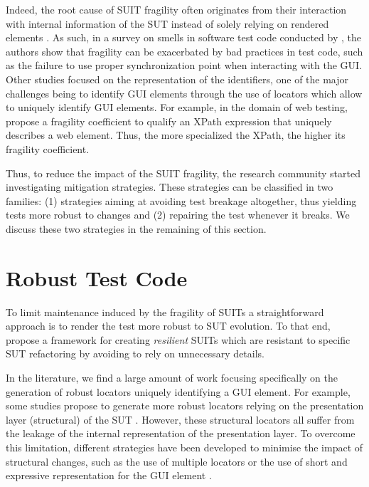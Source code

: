 Indeed, the root cause of SUIT fragility often originates from their interaction with internal information of the SUT instead of solely relying on rendered elements \textcite{Yandrapally2014}. As such, in a survey on smells in software test code conducted by \textcite{Garousi2018}, the authors show that fragility can be exacerbated by bad practices in test code, such as the failure to use proper synchronization point when interacting with the GUI. Other studies focused on the representation of the identifiers, one of the major challenges being to identify GUI elements through the use of locators \cite{Hammoudi2016} which allow to uniquely identify GUI elements. For example, in the domain of web testing, \textcite{Leotta2015} propose a fragility coefficient to qualify an XPath expression that uniquely describes a web element. Thus, the more specialized the XPath, the higher its fragility coefficient.

Thus, to reduce the impact of the SUIT fragility, the research community started investigating mitigation strategies. These strategies can be classified in two families: (1) strategies aiming at avoiding test breakage altogether, thus yielding tests more robust to changes and (2) repairing the test whenever it breaks. We discuss these two strategies in the remaining of this section.

\section{Robust Test Code}
\label{sec:related-robust}

To limit maintenance induced by the fragility of SUITs a straightforward approach is to render the test more robust to SUT evolution. To that end,\cite{Pirzadeh2014} propose a framework for creating \emph{resilient} SUITs which are resistant to specific SUT refactoring by avoiding to rely on unnecessary details. 

In the literature, we find a large amount of work focusing specifically on the generation of robust locators uniquely identifying a GUI element. For example, some studies propose to generate more robust locators relying on the presentation layer (structural) of the SUT \cite{Montoto2011, Leotta2014, Leotta2015, Leotta2016, Zheng2018}. However, these structural locators all suffer from the leakage of the internal representation of the presentation layer. To overcome this limitation, different strategies have been developed to minimise the impact of structural changes, such as the use of multiple locators \cite{Leotta2015, Zheng2018} or the use of short and expressive representation for the GUI element \cite{Montoto2011, Leotta2014, Leotta2015}.

